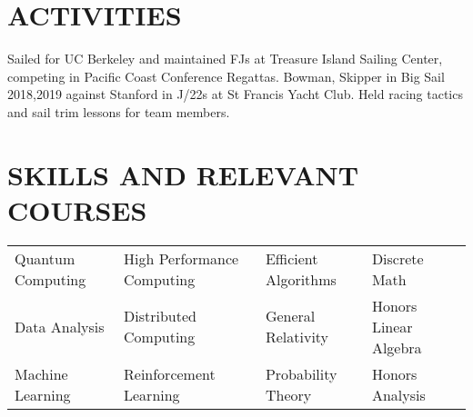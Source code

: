 \documentclass[10pt]{article}
\begin{document}
                  
\section*{ACTIVITIES}

        {Sailed for UC Berkeley and maintained FJs at Treasure Island Sailing Center, competing in Pacific Coast Conference Regattas. 
          Bowman, Skipper in Big Sail 2018,2019 against Stanford in J/22s at St Francis Yacht Club. 
          Held racing tactics and sail trim lessons for team members.}




\section*{SKILLS AND RELEVANT COURSES}
				\setlength{\columnsep}{.5pt}
				\begin{tabu}{X[2c]X[2.5c]X[2c]X[2c]}
					Quantum Computing      & High Performance Computing & Efficient Algorithms & Discrete Math \\
					Data Analysis 			   & Distributed Computing      & General Relativity   & Honors Linear Algebra \\
          Machine Learning		   & Reinforcement Learning     & Probability Theory   & Honors Analysis \\
				\end{tabu}
 
\end{document}
